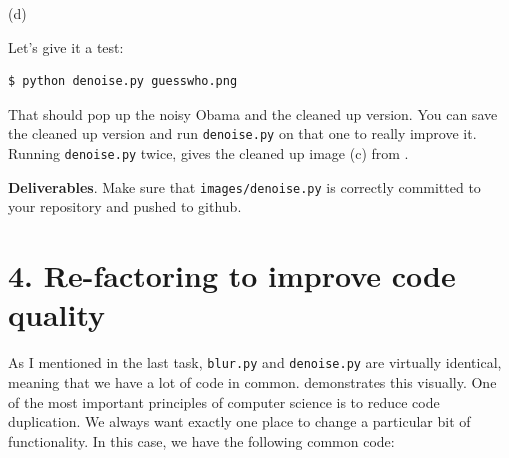 \begin{marginfigure}
\begin{center}
(d) 
\end{center}
\label{obama}
\end{marginfigure}


Let's give it a test:

\begin{lstlisting}[style=BashInputStyle]
$ python denoise.py guesswho.png
\end{lstlisting}

\noindent That should pop up the noisy Obama and the cleaned up version. You can save the cleaned up version and run {\tt denoise.py} on that one to really improve it. Running {\tt denoise.py} twice, gives the cleaned up image (c) from .  

\begin{callout}{\bcplume}
{\bf Deliverables}. Make sure that {\tt images/denoise.py} is correctly committed to your repository and pushed to github.
\end{callout}

\vspace{10mm}
\section{4. Re-factoring to improve code quality}

As I mentioned in the last task, {\tt blur.py} and {\tt denoise.py} are virtually identical, meaning that we have a lot of code in common.  demonstrates this visually. One of the most important principles of computer science is to reduce code duplication. We always want exactly one place to change a particular bit of functionality.   In this case, we have the following common code:

